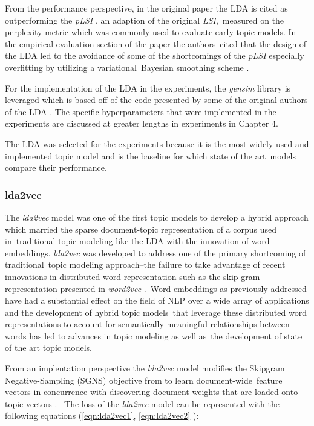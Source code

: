 \documentclass[letterpaper,12pt]{article}
\begin{document}
From the performance perspective, in the original paper the LDA is cited as outperforming the \emph{pLSI} \cite{hofmann1999probabilistic}, an adaption of the original \emph{LSI},\
measured on the perplexity metric which was commonly used to evaluate early topic models. In the empirical evaluation section of the paper the authors\
cited that the design of the LDA led to the avoidance of some of the shortcomings of the \emph{pLSI} especially overfitting by utilizing a variational\
Bayesian smoothing scheme \cite{attias2000variational} \cite{blei2003latent}. 

For the implementation of the LDA in the experiments, the \emph{gensim} library is leveraged which is based off of the code presented by some of the original authors of the LDA \cite{hoffman2010online}.
The specific hyperparameters that were implemented in the experiments are discussed at greater lengths in experiments in Chapter 4.

The LDA was selected for the experiments because it is the most widely used and implemented topic model and is the baseline for which state of the art\
models compare their performance.
\subsubsection{lda2vec}
The \emph{lda2vec} model was one of the first topic models to develop a hybrid approach which married the sparse document-topic representation of a corpus used in\
traditional topic modeling like the LDA with the innovation of word embeddings. \emph{lda2vec} was developed to address one of the primary shortcoming of traditional\
topic modeling approach--the failure to take advantage of recent innovations in distributed word representation such as the skip gram representation presented in \emph{word2vec} \cite{mikolov2013distributed}.\
Word embeddings as previously addressed have had a substantial effect on the field of NLP over a wide array of applications and the development of hybrid topic models\
that leverage these distributed word representations to account for semantically meaningful relationships between words has led to advances in topic modeling as well as\
the development of state of the art topic models.

From an implentation perspective the \emph{lda2vec} model modifies the Skipgram Negative-Sampling (SGNS) objective from \cite{mikolov2013distributed} to learn document-wide\
feature vectors in concurrence with discovering document weights that are loaded onto topic vectors \cite{moody2016mixing}. \
The loss of the \emph{lda2vec} model can be represented with the following equations (\ref{eqn:lda2vec1}, \ref{eqn:lda2vec2} \cite{moody2016mixing}):
\end{document}
